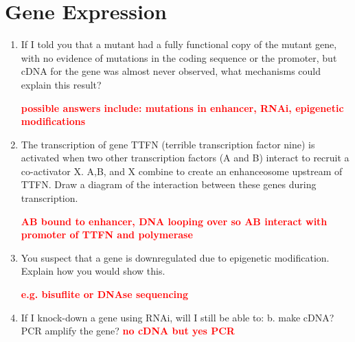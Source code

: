 \documentclass[]{article}
\newcommand{\answer}[1]{\textcolor{red}{\bf #1}}
\begin{document}
\section*{Gene Expression}
\begin{enumerate}
\item  If I told you that a mutant had a fully functional copy of the mutant gene, with no evidence of mutations in the coding sequence or the promoter, but cDNA for the gene was almost never observed, what mechanisms could explain this result?

\answer{possible answers include: mutations in enhancer, RNAi, epigenetic modifications }
\item The transcription of gene TTFN (terrible transcription factor nine) is activated when two other transcription factors (A and B) interact to recruit a co-activator X. A,B, and X combine to create an enhanceosome upstream of TTFN.  Draw a diagram of the interaction between these genes during transcription.   

\answer{AB bound to enhancer, DNA looping over so AB interact with promoter of TTFN and polymerase}
\item You suspect that a gene is downregulated due to epigenetic modification. Explain how you would show this.

\answer{e.g. bisuflite or DNAse sequencing}

\item If I knock-down a gene using RNAi, will I still be able to: b. make cDNA? PCR amplify the gene?
\answer{no cDNA but yes PCR } 

\end{enumerate}

\end{document}
